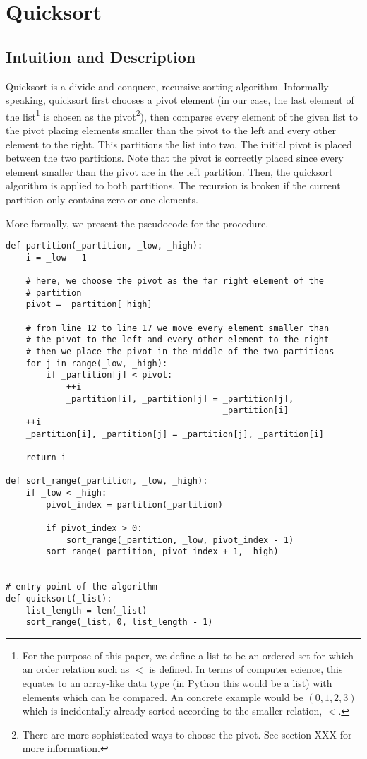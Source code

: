 \section{Quicksort}
\subsection{Intuition and Description}
Quicksort is a divide-and-conquere, recursive sorting algorithm.\cite[p.~145]{bib:introductiontoalgorithms} Informally speaking, quicksort first chooses a pivot element (in our case, the last element of the list\footnote{For the purpose of this paper, we define a list to be an ordered set for which an order relation such as \(<\) is defined. In terms of computer science, this equates to an array-like data type (in Python this would be a list) with elements which can be compared. An concrete example would be \((0, 1, 2, 3)\) which is incidentally already sorted according to the smaller relation, \(<\).} is chosen as the pivot\footnote{There are more sophisticated ways to choose the pivot. See section XXX for more information.}), then compares every element of the given list to the pivot placing elements smaller than the pivot to the left and every other element to the right. This partitions the list into two. The initial pivot is placed between the two partitions. Note that the pivot is correctly placed since every element smaller than the pivot are in the left partition. Then, the quicksort algorithm is applied to both partitions. The recursion is broken if the current partition only contains zero or one elements.

More formally, we present the pseudocode for the procedure.

\begin{lstlisting}
def partition(_partition, _low, _high):
    i = _low - 1

    # here, we choose the pivot as the far right element of the
    # partition
    pivot = _partition[_high]

    # from line 12 to line 17 we move every element smaller than 
    # the pivot to the left and every other element to the right
    # then we place the pivot in the middle of the two partitions
    for j in range(_low, _high):
        if _partition[j] < pivot:
            ++i
            _partition[i], _partition[j] = _partition[j], 
                                           _partition[i]
    ++i
    _partition[i], _partition[j] = _partition[j], _partition[i]

    return i

def sort_range(_partition, _low, _high):
    if _low < _high:
        pivot_index = partition(_partition)

        if pivot_index > 0:
            sort_range(_partition, _low, pivot_index - 1)
        sort_range(_partition, pivot_index + 1, _high)


# entry point of the algorithm
def quicksort(_list):
    list_length = len(_list)
    sort_range(_list, 0, list_length - 1)

\end{lstlisting}

